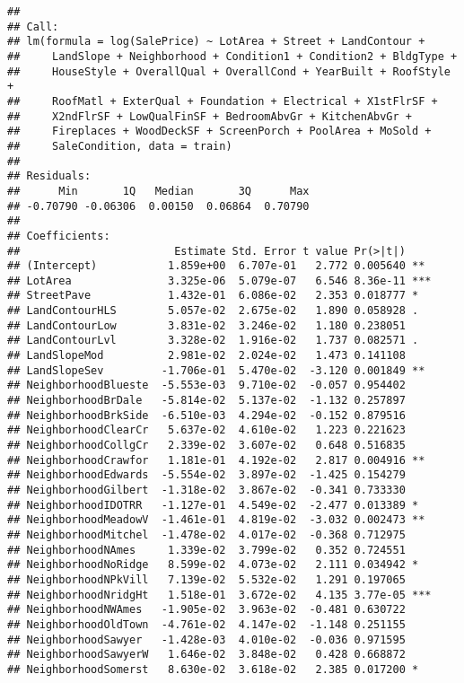 \documentclass[
]{article}
\begin{document}
\begin{verbatim}
## 
## Call:
## lm(formula = log(SalePrice) ~ LotArea + Street + LandContour + 
##     LandSlope + Neighborhood + Condition1 + Condition2 + BldgType + 
##     HouseStyle + OverallQual + OverallCond + YearBuilt + RoofStyle + 
##     RoofMatl + ExterQual + Foundation + Electrical + X1stFlrSF + 
##     X2ndFlrSF + LowQualFinSF + BedroomAbvGr + KitchenAbvGr + 
##     Fireplaces + WoodDeckSF + ScreenPorch + PoolArea + MoSold + 
##     SaleCondition, data = train)
## 
## Residuals:
##      Min       1Q   Median       3Q      Max 
## -0.70790 -0.06306  0.00150  0.06864  0.70790 
## 
## Coefficients:
##                        Estimate Std. Error t value Pr(>|t|)    
## (Intercept)           1.859e+00  6.707e-01   2.772 0.005640 ** 
## LotArea               3.325e-06  5.079e-07   6.546 8.36e-11 ***
## StreetPave            1.432e-01  6.086e-02   2.353 0.018777 *  
## LandContourHLS        5.057e-02  2.675e-02   1.890 0.058928 .  
## LandContourLow        3.831e-02  3.246e-02   1.180 0.238051    
## LandContourLvl        3.328e-02  1.916e-02   1.737 0.082571 .  
## LandSlopeMod          2.981e-02  2.024e-02   1.473 0.141108    
## LandSlopeSev         -1.706e-01  5.470e-02  -3.120 0.001849 ** 
## NeighborhoodBlueste  -5.553e-03  9.710e-02  -0.057 0.954402    
## NeighborhoodBrDale   -5.814e-02  5.137e-02  -1.132 0.257897    
## NeighborhoodBrkSide  -6.510e-03  4.294e-02  -0.152 0.879516    
## NeighborhoodClearCr   5.637e-02  4.610e-02   1.223 0.221623    
## NeighborhoodCollgCr   2.339e-02  3.607e-02   0.648 0.516835    
## NeighborhoodCrawfor   1.181e-01  4.192e-02   2.817 0.004916 ** 
## NeighborhoodEdwards  -5.554e-02  3.897e-02  -1.425 0.154279    
## NeighborhoodGilbert  -1.318e-02  3.867e-02  -0.341 0.733330    
## NeighborhoodIDOTRR   -1.127e-01  4.549e-02  -2.477 0.013389 *  
## NeighborhoodMeadowV  -1.461e-01  4.819e-02  -3.032 0.002473 ** 
## NeighborhoodMitchel  -1.478e-02  4.017e-02  -0.368 0.712975    
## NeighborhoodNAmes     1.339e-02  3.799e-02   0.352 0.724551    
## NeighborhoodNoRidge   8.599e-02  4.073e-02   2.111 0.034942 *  
## NeighborhoodNPkVill   7.139e-02  5.532e-02   1.291 0.197065    
## NeighborhoodNridgHt   1.518e-01  3.672e-02   4.135 3.77e-05 ***
## NeighborhoodNWAmes   -1.905e-02  3.963e-02  -0.481 0.630722    
## NeighborhoodOldTown  -4.761e-02  4.147e-02  -1.148 0.251155    
## NeighborhoodSawyer   -1.428e-03  4.010e-02  -0.036 0.971595    
## NeighborhoodSawyerW   1.646e-02  3.848e-02   0.428 0.668872    
## NeighborhoodSomerst   8.630e-02  3.618e-02   2.385 0.017200 *  

\end{verbatim}
\end{document}
